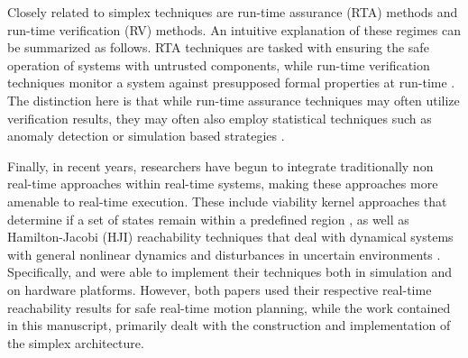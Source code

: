 \documentclass[manuscript,screen,review]{acmart}
\begin{document}
Closely related to simplex techniques are run-time assurance (RTA) methods and run-time verification (RV) methods. An intuitive explanation of these regimes can be summarized as follows. RTA techniques are tasked with ensuring the safe operation of systems with untrusted components, while run-time verification techniques monitor a system against presupposed formal properties at run-time 
\cite{Masson2018,Akametalu2014,mitsch,Daws1998,Phan2020}. The distinction here is that while run-time assurance techniques may often utilize verification results, they may often also employ statistical techniques such as anomaly detection \cite{boursinos2020trusted} or simulation based strategies \cite{Clark2013}. %

Finally, in recent years, researchers have begun to integrate traditionally non real-time approaches within real-time systems, making these approaches more amenable to real-time execution. These include viability kernel approaches that determine if a set of states remain within a predefined region \cite{Gurriet2018,Althoff2014}, as well as Hamilton-Jacobi (HJI) reachability techniques that deal with dynamical systems with general nonlinear dynamics and disturbances in uncertain environments \cite{Herbert2019,Bajcsy2019Provably,bansal2020hamiltonjacobi,Fisac2017,Chen2016,dhinakaran2017hybrid}. Specifically, \cite{Bajcsy2019Provably} and \cite{Althoff2014} were able to implement their techniques both in simulation and on hardware platforms. However, both papers used their respective real-time reachability results for safe real-time motion planning, while the work contained in this manuscript, primarily dealt with the construction and implementation of the simplex architecture. 

\end{document}

